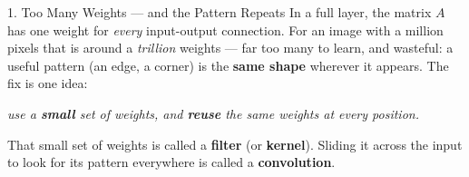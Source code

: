 \documentclass[10pt]{article}
\begin{document}
\begin{notesbox}{1. Too Many Weights --- and the Pattern Repeats}
In a full layer, the matrix $A$ has one weight for \emph{every} input-output connection. For an image with a
million pixels that is around a \emph{trillion} weights --- far too many to learn, and wasteful: a useful
pattern (an edge, a corner) is the \textbf{same shape} wherever it appears. The fix is one idea:
\begin{center}
\emph{use a \textbf{small} set of weights, and \textbf{reuse} the same weights at every position.}
\end{center}
That small set of weights is called a \textbf{filter} (or \textbf{kernel}). Sliding it across the input to
look for its pattern everywhere is called a \textbf{convolution}.
\end{notesbox}
\end{document}
